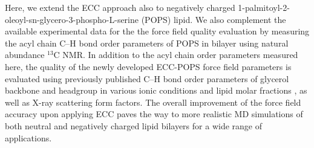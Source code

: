 \documentclass[journal=jpcbfk,manuscript=article]{achemso}
\begin{document}

Here, we extend the ECC approach also to negatively charged 1-palmitoyl-2-oleoyl-sn-glycero-3-phospho-L-serine (POPS) lipid.
We also complement the available experimental data for the the force field quality
evaluation by measuring the acyl chain C--H bond order parameters of POPS in bilayer using natural abundance $^{13}$C NMR.
In addition to the acyl chain order parameters measured here, the quality of the newly developed ECC-POPS force field parameters is
evaluated using previously published C--H bond order parameters of glycerol backbone and headgroup in various ionic
conditions and lipid molar fractions \cite{roux90,NMRlipidsIV}, as well as X-ray scattering form factors\cite{kucerka14}.
The overall improvement of the force field accuracy upon applying ECC
paves the way to more realistic MD simulations 
of both neutral and negatively charged lipid bilayers 
for a wide range of applications.

\end{document}
